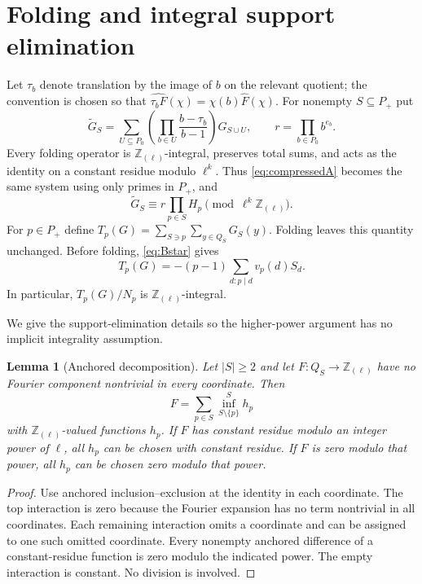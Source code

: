 \documentclass[11pt]{article}
\newtheorem{lemma}[theorem]{Lemma}
\newcommand{\Rl}{\mathbb Z_{(\ell)}}
\begin{document}
\section{Folding and integral support elimination}
Let $\tau_b$ denote translation by the image of $b$ on the relevant quotient; the convention is chosen so that $\widehat{\tau_bF}(\chi)=\chi(b)\widehat F(\chi)$. For nonempty $S\subseteq P_+$ put
\begin{equation}\label{eq:fold}
 \widetilde G_S=\sum_{U\subseteq P_0}
 \left(\prod_{b\in U}\frac{b-\tau_b}{b-1}\right)G_{S\cup U},
 \qquad r=\prod_{b\in P_0}b^{e_b}.
\end{equation}
Every folding operator is $\Rl$-integral, preserves total sums, and acts as the identity on a constant residue modulo $\ell^k$. Thus \eqref{eq:compressedA} becomes the same system using only primes in $P_+$, and
\begin{equation}\label{eq:foldres}
 \widetilde G_S\equiv r\prod_{p\in S}H_p\pmod{\ell^k\Rl}.
\end{equation}
For $p\in P_+$ define $T_p(G)=\sum_{S\ni p}\sum_{y\in Q_S}G_S(y)$. Folding leaves this quantity unchanged. Before folding, \eqref{eq:Bstar} gives
\begin{equation}\label{eq:Toriginal}
 T_p(G)=-(p-1)\sum_{d:p\mid d}v_p(d)S_d.
\end{equation}
In particular, $T_p(G)/N_p$ is $\Rl$-integral.

We give the support-elimination details so the higher-power argument has no implicit integrality assumption.
\begin{lemma}[Anchored decomposition]\label{lem:anchor}
Let $|S|\ge2$ and let $F:Q_S\to\Rl$ have no Fourier component nontrivial in every coordinate. Then
\[
 F=\sum_{p\in S}\operatorname{inf}_{S\setminus\{p\}}^S h_p
\]
with $\Rl$-valued functions $h_p$. If $F$ has constant residue modulo an integer power of $\ell$, all $h_p$ can be chosen with constant residue. If $F$ is zero modulo that power, all $h_p$ can be chosen zero modulo that power.
\end{lemma}
\begin{proof}
Use anchored inclusion--exclusion at the identity in each coordinate. The top interaction is zero because the Fourier expansion has no term nontrivial in all coordinates. Each remaining interaction omits a coordinate and can be assigned to one such omitted coordinate. Every nonempty anchored difference of a constant-residue function is zero modulo the indicated power. The empty interaction is constant. No division is involved.
\end{proof}
\end{document}
